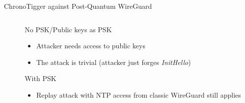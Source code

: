 \begin{frame}{ChronoTigger against Post-Quantum WireGuard}
  \begin{columns}[fullwidth,T]
    \begin{column}{.5\linewidth}
    \end{column}

    \begin{column}{.4\linewidth}
      \begin{block}{No PSK/Public keys as PSK}
      \begin{itemize}
        \item Attacker needs access to public keys
        \item The attack is trivial (attacker just forges \emph{InitHello})
      \end{itemize}
      \end{block}

      \begin{block}{With PSK}
      \begin{itemize}
        \item Replay attack with NTP access from classic WireGuard still applies
      \end{itemize}
      \end{block}
    \end{column}
  \end{columns}
\end{frame}


